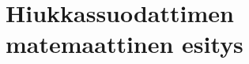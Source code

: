 \section{Hiukkassuodattimen matemaattinen esitys}

\begin{figure}[H]
    \centering 
    
    \caption{}
    \label{fig:blocks1}
\end{figure}
\cite{LiuGuanlin2021Roio}
